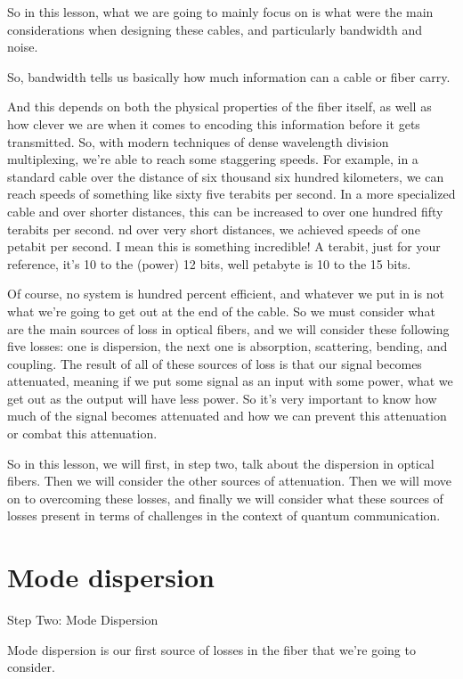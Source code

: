 So in this lesson, what we are going to mainly focus on is what were the main considerations when designing these cables, and particularly bandwidth and noise.

So, bandwidth tells us basically how much information can a cable or fiber carry.

And this depends on both the physical properties of the fiber itself, as well as how clever we are when it comes to encoding this information before it gets transmitted. So, with modern techniques of dense wavelength division multiplexing, we're able to reach some staggering speeds. For example, in a standard cable over the distance of six thousand six hundred kilometers, we can reach speeds of something like sixty five terabits per second. In a more specialized cable and over shorter distances, this can be increased to over one hundred fifty terabits per second. nd over very short distances, we achieved speeds of one petabit per second. I mean this is something incredible! A terabit, just for your reference, it's 10 to the (power) 12 bits, well petabyte is 10 to the 15 bits.

Of course, no system is hundred percent efficient, and whatever we put in is not what we're going to get out at the end of the cable. So we must consider what are the main sources of loss in optical fibers, and we will consider these following five losses: one is dispersion, the next one is absorption, scattering, bending, and coupling. The result of all of these sources of loss is that our signal becomes attenuated, meaning if we put some signal as an input with some power, what we get out as the output will have less power. So it's very important to know how much of the signal becomes attenuated and how we can prevent this attenuation or combat this attenuation.

So in this lesson, we will first, in step two, talk about the dispersion in optical fibers. Then we will consider the other sources of attenuation. Then we will move on to overcoming these losses, and finally we will consider what these sources of losses present in terms of challenges in the context of quantum communication.


\section{Mode dispersion}

Step Two: Mode Dispersion

Mode dispersion is our first source of losses in the fiber that we're going to consider.

